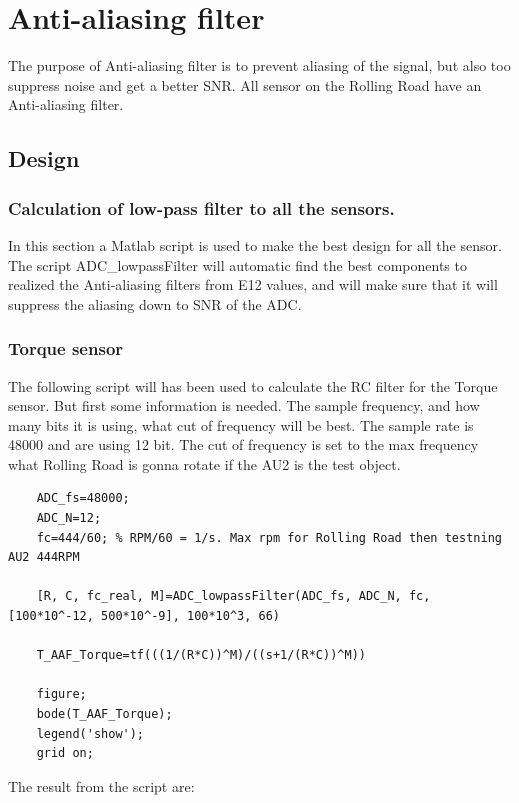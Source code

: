 \newpage
\section{Anti-aliasing filter}
The purpose of Anti-aliasing filter is to prevent aliasing of the signal, but also too suppress noise and get a better SNR. All sensor on the Rolling Road have an Anti-aliasing filter.  

\subsection{Design}

	
	\subsubsection{Calculation of low-pass filter to all the sensors.}
	
	In this section a Matlab script is used to make the best design for all the sensor.
	The script ADC\_lowpassFilter will automatic find the best components to realized the Anti-aliasing filters from E12 values, and will make sure that it will suppress the aliasing down to SNR of the ADC.
	
	
		
	\subsubsection*{Torque sensor}
	
	The following script will has been used to calculate the RC filter for the Torque sensor. But first some information is needed. The sample frequency, and how many bits it is using, what cut of frequency will be best. 
	The sample rate is 48000 and are using 12 bit. The cut of frequency is set to the max frequency what Rolling Road is gonna rotate if the AU2 is the test object. 
	
	\begin{lstlisting}
	ADC_fs=48000;
	ADC_N=12;
	fc=444/60; % RPM/60 = 1/s. Max rpm for Rolling Road then testning AU2 444RPM
	
	[R, C, fc_real, M]=ADC_lowpassFilter(ADC_fs, ADC_N, fc, [100*10^-12, 500*10^-9], 100*10^3, 66)
	
	T_AAF_Torque=tf(((1/(R*C))^M)/((s+1/(R*C))^M))
	
	figure;
	bode(T_AAF_Torque);
	legend('show');
	grid on;
	\end{lstlisting}
	
	The result from the script are:
	
